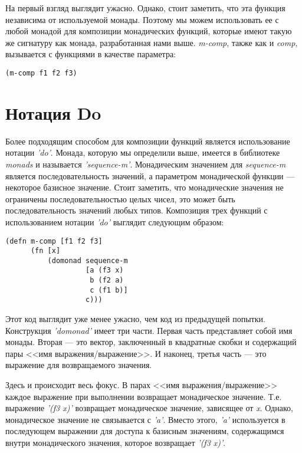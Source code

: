 \documentclass[a4paper,12pt]{article}
\newcommand{\cl}[1] {{\it #1}}
\begin{document}
На первый взгляд выглядит ужасно. Однако, стоит заметить, что эта функция независима от
используемой монады. Поэтому мы можем использовать ее с любой монадой для композиции 
монадических функций, которые имеют такую же сигнатуру как монада, разработанная нами выше. 
\cl{m-comp}, также как и \cl{comp}, вызывается с функциями в качестве параметра:

\begin{verbatim}
(m-comp f1 f2 f3)
\end{verbatim}



\section{Нотация Do}\label{do-notation}
Более подходящим способом для композиции функций является использование нотации \cl{'do'}. 
Монада, которую мы определили выше, имеется в библиотеке \cl{monads} и %
называется \cl{'sequence-m'}. Монадическим значением для \cl{sequence-m} является последовательность
значений, а параметром монадической функции --- некоторое базисное значение. %
Стоит заметить, что монадические значения не ограничены последовательностью 
целых чисел, это может быть последовательность значений любых типов. 
Композиция трех функций с использованием нотации \cl{'do'} выглядит следующим образом:

\begin{verbatim}
(defn m-comp [f1 f2 f3]
      (fn [x]
          (domonad sequence-m
                   [a (f3 x)
                    b (f2 a)
                    c (f1 b)]
                   c)))
\end{verbatim}
Этот код выглядит уже менее ужасно, чем код из предыдущей попытки. Конструкция \cl{'domonad'} имеет три части.
Первая часть представляет собой имя монады. Вторая --- это вектор, заключенный
в квадратные скобки и содержащий пары <<имя выражения/выражение>>.
И наконец, третья часть --- это выражение для возвращаемого значения. 

Здесь и происходит весь фокус. В парах <<имя выражения/выражение>> каждое выражение при выполнении 
возвращает монадическое значение. Т.е. выражение \cl{'(f3 x)'} возвращает монадическое значение, зависящее от
\cl{x}. Однако, монадическое значение не связывается с \cl{'a'}. Вместо этого, \cl{'a'} используется в последующем выражении 
для доступа к базисным значениям, содержащимся внутри монадического значения, которое возвращает \cl{'(f3 x)'}.
\end{document}
